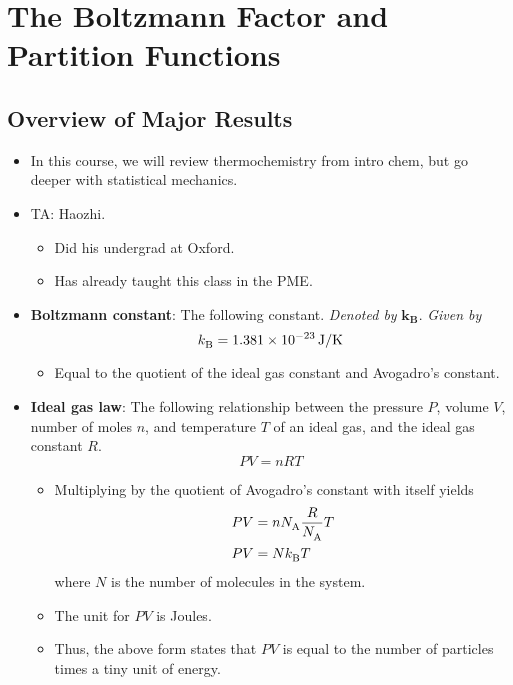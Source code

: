 \documentclass[../notes.tex]{subfiles}
\begin{document}
\chapter{The Boltzmann Factor and Partition Functions}
\section{Overview of Major Results}
\begin{itemize}
    \item {}In this course, we will review thermochemistry from intro chem, but go deeper with statistical mechanics.
    \item TA: Haozhi.
    \begin{itemize}
        \item Did his undergrad at Oxford.
        \item Has already taught this class in the PME.
    \end{itemize}
    \item \textbf{Boltzmann constant}: The following constant. \emph{Denoted by} $\bm{k_\textbf{B}^{}}$. \emph{Given by}
    \begin{equation*}
        \kB = \SI[per-mode=symbol]{1.381e-23}{\joule\per\kelvin}
    \end{equation*}
    \begin{itemize}
        \item Equal to the quotient of the ideal gas constant and Avogadro's constant.
    \end{itemize}
    \item \textbf{Ideal gas law}: The following relationship between the pressure $P$, volume $V$, number of moles $n$, and temperature $T$ of an ideal gas, and the ideal gas constant $R$.
    \begin{equation*}
        PV = nRT
    \end{equation*}
    \begin{itemize}
        \item Multiplying by the quotient of Avogadro's constant with itself yields
        \begin{align*}
            PV &= n\NA\frac{R}{\NA}T\\
            PV &= N\kB T
        \end{align*}
        where $N$ is the number of molecules in the system.
        \item The unit for $PV$ is Joules.
        \item Thus, the above form states that $PV$ is equal to the number of particles times a tiny unit of energy.

\end{itemize}
\end{itemize}
\end{document}
